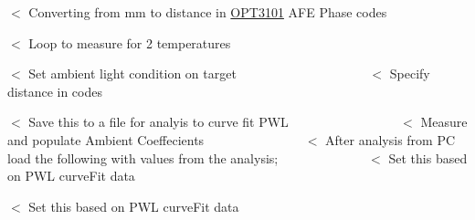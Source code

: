 $<$ Converting from mm to distance in \mbox{\hyperlink{namespace_o_p_t3101}{O\+P\+T3101}} A\+FE Phase codes

$<$ Loop to measure for 2 temperatures

$<$ Set ambient light condition on target ~\newline
~\newline
~\newline
~\newline
~\newline
~\newline
~\newline
~\newline
~\newline
~\newline
~\newline
~\newline
 $<$ Specify distance in codes

$<$ Save this to a file for analyis to curve fit P\+WL ~\newline
~\newline
~\newline
~\newline
~\newline
~\newline
~\newline
~\newline
~\newline
~\newline
 $<$ Measure and populate Ambient Coeffecients ~\newline
~\newline
~\newline
~\newline
~\newline
~\newline
~\newline
~\newline
~\newline
 $<$ After analysis from PC load the following with values from the analysis; ~\newline
~\newline
~\newline
~\newline
~\newline
~\newline
~\newline
~\newline
 $<$ Set this based on P\+WL curve\+Fit data

$<$ Set this based on P\+WL curve\+Fit data

